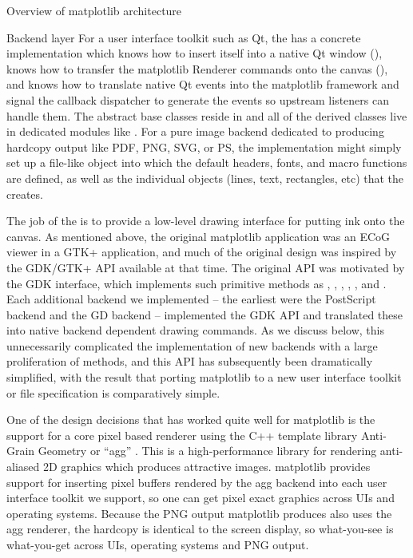 \begin{aosasect1}{Overview of matplotlib architecture}
\begin{aosasect2}{Backend layer}
For a user interface toolkit such as Qt, the  has a
concrete implementation which knows how to insert itself into a native
Qt window (), knows how to transfer the
matplotlib Renderer commands onto the canvas (),
and knows how to translate native Qt events into the matplotlib
 framework and signal the callback dispatcher to generate
the events so upstream listeners can handle them.  The abstract base
classes reside in  and all of the
derived classes live in dedicated modules like
.  For a pure image backend
dedicated to producing hardcopy output like PDF, PNG, SVG, or PS, the
 implementation might simply set up a file-like
object into which the default headers, fonts, and macro functions are
defined, as well as the individual objects (lines, text, rectangles,
etc) that the  creates.

The job of the  is to provide a low-level drawing
interface for putting ink onto the canvas.  As mentioned above, the
original matplotlib application was an ECoG viewer in a GTK+
application, and much of the original design was inspired by the
GDK/GTK+ API available at that time.  The original  API
was motivated by the GDK  interface, which implements
such primitive methods as , ,
, , , and
.  Each additional backend we implemented -- the
earliest were the PostScript backend and the GD backend -- implemented
the GDK  API and translated these into native backend
dependent drawing commands.  As we discuss below, this unnecessarily
complicated the implementation of new backends with a large
proliferation of methods, and this API has subsequently been
dramatically simplified, with the result that porting matplotlib to a
new user interface toolkit or file specification is comparatively
simple.

One of the design decisions that has worked quite well for matplotlib
is the support for a core pixel based renderer using the C++ template
library Anti-Grain Geometry or ``agg'' \cite{bib:agg}.  This is a
high-performance library for rendering anti-aliased 2D graphics which
produces attractive images.  matplotlib provides support for inserting
pixel buffers rendered by the agg backend into each user interface
toolkit we support, so one can get pixel exact graphics across UIs and
operating systems.  Because the PNG output matplotlib produces also
uses the agg renderer, the hardcopy is identical to the screen
display, so what-you-see is what-you-get across UIs, operating systems
and PNG output.


\end{aosasect2}
\end{aosasect1}

